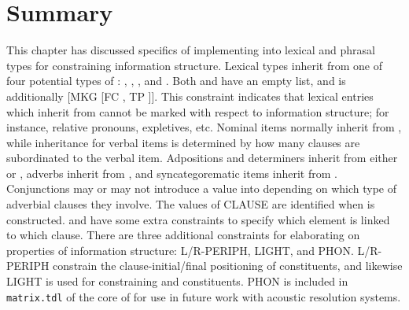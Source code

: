 \section{Summary}
\label{10-1:sec:summary}

This chapter has discussed specifics of implementing  into
lexical and phrasal types for constraining information
structure. Lexical types inherit from one of four potential types of
: ,
, , and
.  Both  and
 have an empty  list, and
 is additionally [MKG [FC , TP
    ]]. This constraint indicates that lexical entries
which inherit from  cannot be marked with
respect to information structure; for instance, relative pronouns,
expletives, etc.  Nominal items normally inherit from
, while inheritance for verbal items is
determined by how many clauses are subordinated to the verbal
item. Adpositions and determiners inherit from either
 or , adverbs
inherit from , and syncategorematic items
inherit from . Conjunctions may or may not
introduce a  value into  depending on which type
of adverbial clauses they involve. The values of CLAUSE are identified
when  is constructed.
 and  have
some extra constraints to specify which element is linked to which
clause. There are three additional
constraints for elaborating on properties of information structure:
L/R-PERIPH, LIGHT, and PHON.  L/R-PERIPH constrain the
clause-initial/final positioning of constituents, and likewise LIGHT
is used for constraining  and 
constituents. PHON is included in \texttt{matrix.tdl} of the core of
\lingo {} for use in future work with acoustic
resolution systems.

